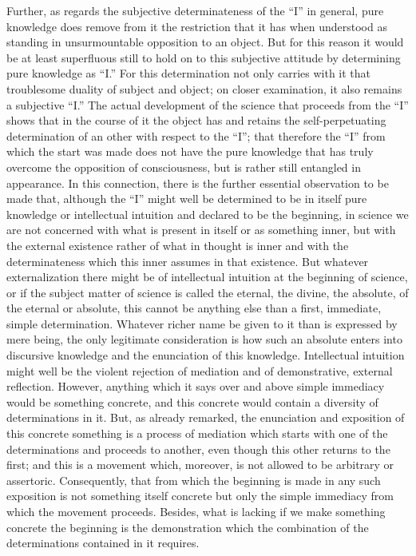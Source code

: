Further, as regards the subjective determinateness of the “I” in general,
pure knowledge does remove from it the restriction that it has
when understood as standing in unsurmountable opposition to an object.
But for this reason it would be at least superfluous
still to hold on to this subjective attitude
by determining pure knowledge as “I.”
For this determination not only carries with it
that troublesome duality of subject and object;
on closer examination, it also remains a subjective “I.”
The actual development of the science that proceeds from the “I”
shows that in the course of it the object has and retains
the self-perpetuating determination of an other
with respect to the “I”;
that therefore the “I” from which the start was made
does not have the pure knowledge that has truly overcome
the opposition of consciousness,
but is rather still entangled in appearance.
In this connection, there is the further
essential observation to be made that,
although the “I” might well be determined to be
in itself pure knowledge or intellectual intuition
and declared to be the beginning,
in science we are not concerned with
what is present in itself or as something inner,
but with the external existence rather of what in thought is inner
and with the determinateness which this inner assumes in that existence.
But whatever externalization there might be of
intellectual intuition at the beginning of science,
or if the subject matter of science is called
the eternal, the divine, the absolute,
of the eternal or absolute,
this cannot be anything else than a first, immediate, simple determination.
Whatever richer name be given to it than is expressed by mere being,
the only legitimate consideration is how
such an absolute enters into discursive knowledge
and the enunciation of this knowledge.
Intellectual intuition might well be the violent rejection
of mediation and of demonstrative, external reflection.
However, anything which it says over and above
simple immediacy would be something concrete,
and this concrete would contain a diversity of determinations in it.
But, as already remarked, the enunciation and exposition
of this concrete something is a process of mediation
which starts with one of the determinations and proceeds to another,
even though this other returns to the first;
and this is a movement which, moreover, is
not allowed to be arbitrary or assertoric.
Consequently, that from which the beginning is made in any
such exposition is not something itself concrete
but only the simple immediacy from which the movement proceeds.
Besides, what is lacking if we make something concrete the beginning
is the demonstration which the combination of the determinations
contained in it requires.

